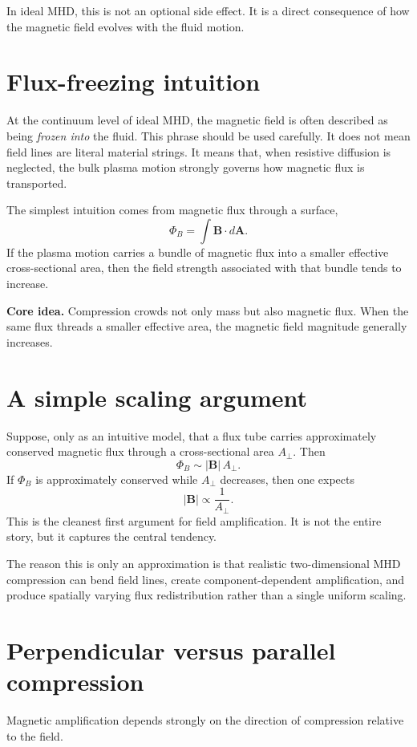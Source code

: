 \documentclass[11pt]{article}
\begin{document}
In ideal MHD, this is not an optional side effect. It is a direct consequence of how the magnetic field evolves with the fluid motion.

\section{Flux-freezing intuition}
At the continuum level of ideal MHD, the magnetic field is often described as being \emph{frozen into} the fluid. This phrase should be used carefully. It does not mean field lines are literal material strings. It means that, when resistive diffusion is neglected, the bulk plasma motion strongly governs how magnetic flux is transported.

The simplest intuition comes from magnetic flux through a surface,
\[
\Phi_B = \int \mathbf{B}\cdot d\mathbf{A}.
\]
If the plasma motion carries a bundle of magnetic flux into a smaller effective cross-sectional area, then the field strength associated with that bundle tends to increase.

\begin{physicsbox}
\textbf{Core idea.} Compression crowds not only mass but also magnetic flux. When the same flux threads a smaller effective area, the magnetic field magnitude generally increases.
\end{physicsbox}

\section{A simple scaling argument}
Suppose, only as an intuitive model, that a flux tube carries approximately conserved magnetic flux through a cross-sectional area $A_\perp$. Then
\[
\Phi_B \sim |\mathbf{B}|\,A_\perp.
\]
If $\Phi_B$ is approximately conserved while $A_\perp$ decreases, then one expects
\[
|\mathbf{B}| \propto \frac{1}{A_\perp}.
\]
This is the cleanest first argument for field amplification. It is not the entire story, but it captures the central tendency.

The reason this is only an approximation is that realistic two-dimensional MHD compression can bend field lines, create component-dependent amplification, and produce spatially varying flux redistribution rather than a single uniform scaling.

\section{Perpendicular versus parallel compression}
Magnetic amplification depends strongly on the direction of compression relative to the field.
\end{document}

